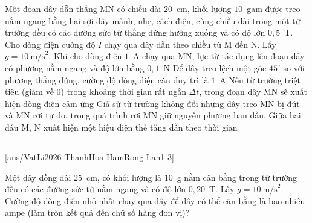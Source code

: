 	\begin{ex}%
		Một đoạn dây dẫn thẳng MN có chiều dài $20$~cm, khối lượng $10$~gam được treo nằm ngang bằng hai sợi dây mảnh, nhẹ, cách điện, cùng chiều dài trong một từ trường đều có các đường sức từ thẳng đứng hướng xuống và có độ lớn $0{,}5$~T. Cho dòng điện cường độ $I$ chạy qua dây dẫn theo chiều từ M đến N. Lấy $g=10~\text{m/s}^2$.
		\choiceTFt
		{\True Khi cho dòng điện $1$~A chạy qua MN, lực từ tác dụng lên đoạn dây có phương nằm ngang và độ lớn bằng $0{,}1$~N}
		{\True Để dây treo lệch một góc $45^\circ$ so với phương thẳng đứng, cường độ dòng điện cần duy trì là $1$~A}
		{Nếu từ trường triệt tiêu (giảm về $0$) trong khoảng thời gian rất ngắn $\Delta t$, trong đoạn dây MN sẽ xuất hiện dòng điện cảm ứng}
		{Giả sử từ trường không đổi nhưng dây treo MN bị đứt và MN rơi tự do, trong quá trình rơi MN giữ nguyên phương ban đầu. Giữa hai đầu M, N xuất hiện một hiệu điện thế tăng dần theo thời gian}
	\end{ex}

	\subsection*{}
	\setcounter{ex}{0}
	[ans/VatLi2026-ThanhHoa-HamRong-Lan1-3]

	\begin{ex}%
		Một dây đồng dài $25$~cm, có khối lượng là $10$~g nằm cân bằng trong từ trường đều có các đường sức từ nằm ngang và có độ lớn $0{,}20$~T. Lấy $g=10~\text{m/s}^2$. Cường độ dòng điện nhỏ nhất chạy qua dây để dây có thể cân bằng là bao nhiêu ampe (làm tròn kết quả đến chữ số hàng đơn vị)?
		\par
	\end{ex}

